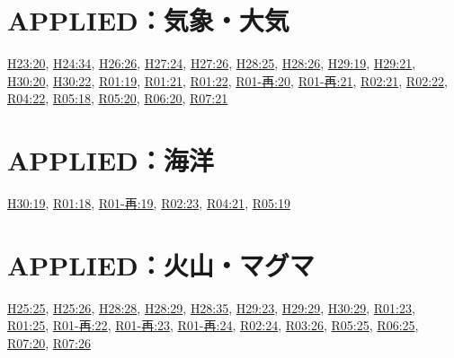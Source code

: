\section{APPLIED：気象・大気}
\hyperref[q:h23-reg-applied-20]{H23:20}, \hyperref[q:h24-reg-applied-34]{H24:34}, \hyperref[q:h26-reg-applied-26]{H26:26}, \hyperref[q:h27-reg-applied-24]{H27:24}, \hyperref[q:h27-reg-applied-26]{H27:26}, \hyperref[q:h28-reg-applied-25]{H28:25}, \hyperref[q:h28-reg-applied-26]{H28:26}, \hyperref[q:h29-reg-applied-19]{H29:19}, \hyperref[q:h29-reg-applied-21]{H29:21}, \hyperref[q:h30-reg-applied-20]{H30:20}, \hyperref[q:h30-reg-applied-22]{H30:22}, \hyperref[q:r01-reg-applied-19]{R01:19}, \hyperref[q:r01-reg-applied-21]{R01:21}, \hyperref[q:r01-reg-applied-22]{R01:22}, \hyperref[q:r01-ret-applied-20]{R01-再:20}, \hyperref[q:r01-ret-applied-21]{R01-再:21}, \hyperref[q:r02-reg-applied-21]{R02:21}, \hyperref[q:r02-reg-applied-22]{R02:22}, \hyperref[q:r04-reg-applied-22]{R04:22}, \hyperref[q:r05-reg-applied-18]{R05:18}, \hyperref[q:r05-reg-applied-20]{R05:20}, \hyperref[q:r06-reg-applied-20]{R06:20}, \hyperref[q:r07-reg-applied-21]{R07:21}
\section{APPLIED：海洋}
\hyperref[q:h30-reg-applied-19]{H30:19}, \hyperref[q:r01-reg-applied-18]{R01:18}, \hyperref[q:r01-ret-applied-19]{R01-再:19}, \hyperref[q:r02-reg-applied-23]{R02:23}, \hyperref[q:r04-reg-applied-21]{R04:21}, \hyperref[q:r05-reg-applied-19]{R05:19}
\section{APPLIED：火山・マグマ}
\hyperref[q:h25-reg-applied-25]{H25:25}, \hyperref[q:h25-reg-applied-26]{H25:26}, \hyperref[q:h28-reg-applied-28]{H28:28}, \hyperref[q:h28-reg-applied-29]{H28:29}, \hyperref[q:h28-reg-applied-35]{H28:35}, \hyperref[q:h29-reg-applied-23]{H29:23}, \hyperref[q:h29-reg-applied-29]{H29:29}, \hyperref[q:h30-reg-applied-29]{H30:29}, \hyperref[q:r01-reg-applied-23]{R01:23}, \hyperref[q:r01-reg-applied-25]{R01:25}, \hyperref[q:r01-ret-applied-22]{R01-再:22}, \hyperref[q:r01-ret-applied-23]{R01-再:23}, \hyperref[q:r01-ret-applied-24]{R01-再:24}, \hyperref[q:r02-reg-applied-24]{R02:24}, \hyperref[q:r03-reg-applied-26]{R03:26}, \hyperref[q:r05-reg-applied-25]{R05:25}, \hyperref[q:r06-reg-applied-25]{R06:25}, \hyperref[q:r07-reg-applied-20]{R07:20}, \hyperref[q:r07-reg-applied-26]{R07:26}
